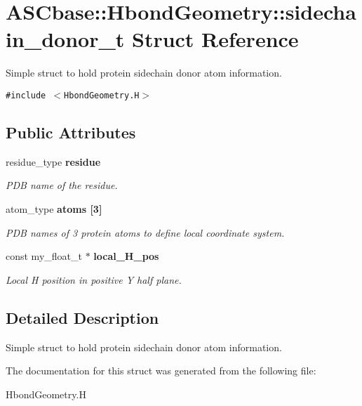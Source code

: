 \section{ASCbase::Hbond\-Geometry::sidechain\_\-donor\_\-t Struct Reference}
\label{structASCbase_1_1HbondGeometry_1_1sidechain__donor__t}
Simple struct to hold protein sidechain donor atom information.  


{\tt \#include $<$Hbond\-Geometry.H$>$}

\subsection*{Public Attributes}
\begin{CompactItemize}
\item 
residue\_\-type \bf{residue}\label{structASCbase_1_1HbondGeometry_1_1sidechain__donor__t_9017603a27e92ffaebfd31624dc53a8f}

\begin{CompactList}\small\item\em PDB name of the residue. \item\end{CompactList}\item 
atom\_\-type \bf{atoms} [3]\label{structASCbase_1_1HbondGeometry_1_1sidechain__donor__t_763c0e885b56b98b418110042dcfc0a3}

\begin{CompactList}\small\item\em PDB names of 3 protein atoms to define local coordinate system. \item\end{CompactList}\item 
const my\_\-float\_\-t $\ast$ \bf{local\_\-H\_\-pos}\label{structASCbase_1_1HbondGeometry_1_1sidechain__donor__t_2fe0faa36a5df2f8885b102c80a4314e}

\begin{CompactList}\small\item\em Local H position in positive Y half plane. \item\end{CompactList}\end{CompactItemize}


\subsection{Detailed Description}
Simple struct to hold protein sidechain donor atom information. 



The documentation for this struct was generated from the following file:\begin{CompactItemize}
\item 
Hbond\-Geometry.H\end{CompactItemize}
